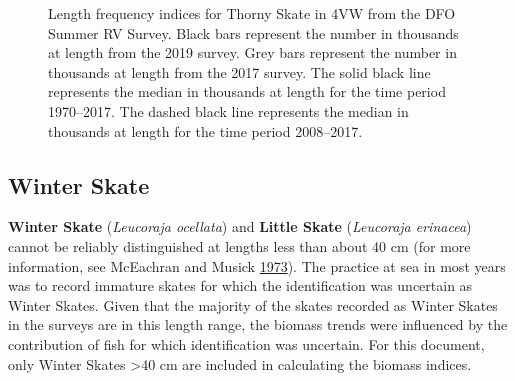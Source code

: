 \documentclass[11pt]{book}
\begin{document}
\begin{figure}[htb]

{\centering {} 

}

\caption{Length frequency indices for Thorny Skate in 4VW from the DFO Summer RV Survey. Black bars represent the number in thousands at length from the 2019 survey. Grey bars represent the number in thousands at length from the 2017 survey. The solid black line represents the median in thousands at length for the time period 1970--2017. The dashed black line represents the median in thousands at length for the time period 2008--2017.}\label{fig:89-fig-thornyskate-lengthfreq4VW}
\end{figure}
\clearpage

\hypertarget{winter-skate}{%
\subsection{Winter Skate}\label{winter-skate}}

\textbf{Winter Skate} (\emph{Leucoraja ocellata}) and \textbf{Little Skate} (\emph{Leucoraja erinacea}) cannot be reliably distinguished at lengths less than about 40 cm (for more information, see McEachran and Musick \protect\hyperlink{ref-McEachran1973}{1973}). The practice at sea in most years was to record immature skates for which the identification was uncertain as Winter Skates. Given that the majority of the skates recorded as Winter Skates in the surveys are in this length range, the biomass trends were influenced by the contribution of fish for which identification was uncertain. For this document, only Winter Skates \textgreater40 cm are included in calculating the biomass indices.
\end{document}
